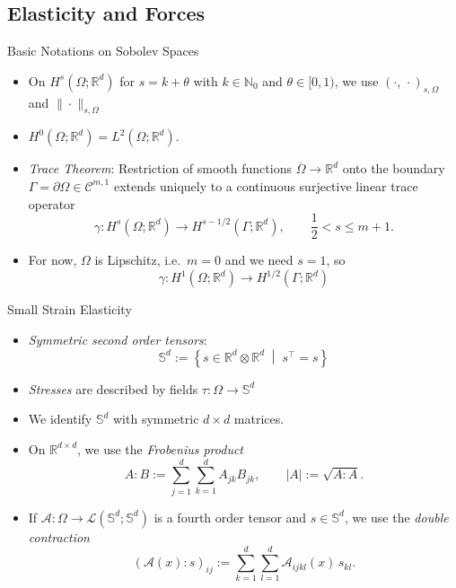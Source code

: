 \documentclass[10pt,aspectratio=169]{beamer}
\def\N{{\mathbb N}}
\def\R{{\mathbb R}}
\def\S{{\mathbb S}}
\def\cA{{\mathcal A}}
\def\cC{{\mathcal C}}
\def\cL{{\mathcal L}}
\begin{document}
\subsection{Elasticity and Forces}

\begin{frame}{Basic Notations on Sobolev Spaces}
	\begin{itemize}
		\item On $H^s(\Omega;\R^d)$ for $s =k+\theta$ with $k\in \N_0$ and $\theta\in[0,1)$, we use $(\cdot,\,\cdot)_{s,\Omega}$ and $\|\cdot\|_{s,\Omega}$
		\item $H^0(\Omega;\R^d) = L^2(\Omega;\R^d)$.
		\item {\em Trace Theorem}: Restriction of smooth functions $\overline{\Omega}\to\R^d$ onto the boundary $\Gamma = \partial\Omega\in\cC^{m,1}$ extends uniquely to a continuous surjective linear trace operator
		      \begin{equation*}
			      \gamma: H^s(\Omega;\R^d)\to H^{s-1/2}(\Gamma;\R^d),\qquad \frac{1}{2}<s\le m+1.
		      \end{equation*}
		\item For now, $\Omega$ is Lipschitz, i.e.\ $m=0$ and we need $s = 1$, so
		      \begin{equation*}
			      \gamma: H^1(\Omega;\R^d)\to H^{1/2}(\Gamma;\R^d)
		      \end{equation*}
	\end{itemize}
\end{frame}

\begin{frame}{Small Strain Elasticity}
	\begin{itemize}
		\item {\em Symmetric second order tensors}:
		      \begin{equation*}
			      \S^d:=\left\{s\in\R^d\otimes\R^d\;\middle|\;s^\top = s\right\}
		      \end{equation*}
		\item {\em Stresses} are described by fields $\tau:\Omega\to\S^d$
		\item We identify $\S^d$ with symmetric $d\times d$ matrices.
		\item On $\R^{d\times d}$, we use the {\em Frobenius product}
		      \begin{equation*}
			      A:B := \sum_{j=1}^d\sum_{k=1}^d A_{jk}B_{jk},
			      \qquad
			      |A| := \sqrt{A:A}.
		      \end{equation*}
		\item If $\cA:\Omega\to\cL(\S^d;\S^d)$ is a fourth order tensor and $s\in\S^d$, we use the {\em double contraction}
		      \begin{equation*}
			      (\cA(x):s)_{ij}:=\sum_{k = 1}^d \sum_{l = 1}^d \cA_{ijkl}(x)\,s_{kl}.
		      \end{equation*}
	\end{itemize}
\end{frame}
\end{document}

